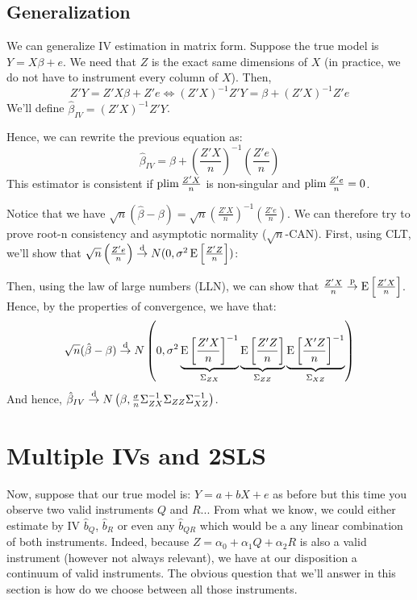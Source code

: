 \subsection{Generalization}

We can generalize IV estimation in matrix form. Suppose the true model is $Y = X\beta + e$. We need that $Z$ is the exact same dimensions of $X$ (in practice, we do not have to instrument every column of $X$). Then, $$Z'Y = Z'X\beta + Z'e \Leftrightarrow (Z'X)^{-1}Z'Y = \beta + (Z'X)^{-1}Z'e $$ We'll define $\hat\beta_{IV} = (Z'X)^{-1}Z'Y$.

Hence, we can rewrite the previous equation as: $$\hat\beta_{IV} = \beta + \left(\frac{Z'X}{n}\right)^{-1}\left(\frac{Z'e}{n}\right) $$
This estimator is consistent if $\operatorname{plim} \frac{Z'X}{n}$ is non-singular and $\operatorname{plim} \frac{Z'e}{n} = 0$.

Notice that we have $\sqrt{n}(\hat{\beta} - \beta) = \sqrt{n}\left(\frac{Z'X}{n}\right)^{-1}\left(\frac{Z'e}{n}\right)$. We can therefore try to prove root-n consistency and asymptotic normality ($\sqrt{n}$-CAN). First, using CLT, we'll show that $\sqrt{n}\left(\frac{Z'e}{n}\right)\overset{\text{d}}{\to} N(0,\sigma^2\operatorname{E}\left[\frac{Z'Z}{n}\right])$:

Then, using the law of large numbers (LLN), we can show that $\frac{Z'X}{n}\overset{\text{p}}{\to} \operatorname{E}\left[\frac{Z'X}{n}\right]$. Hence, by the properties of convergence, we have that: $$ \sqrt{n}(\hat{\beta} - \beta) \overset{\text{d}}{\to} N\left(0, \sigma^2 \underbrace{\operatorname{E}\left[\frac{Z'X}{n}\right]^{-1}}_{\Sigma_{ZX}}\underbrace{\operatorname{E}\left[\frac{Z'Z}{n}\right]}_{\Sigma_{ZZ}}\underbrace{\operatorname{E}\left[\frac{X'Z}{n}\right]^{-1}}_{\Sigma_{XZ}}\right)$$And hence, $\hat\beta_{IV}\overset{\text{d}}{\to} N\left(\beta, \frac{\sigma}{n}\Sigma_{ZX}^{-1}\Sigma_{ZZ}\Sigma_{XZ}^{-1}\right)$.

\section{Multiple IVs and 2SLS}

Now, suppose that our true model is: $Y = a + bX + e$ as before but this time you observe two valid instruments $Q$ and $R$... From what we know, we could either estimate by IV $\hat b_Q$, $\hat b_R$ or even any $\hat b_{QR}$ which would be a any linear combination of both instruments. Indeed, because $Z = \alpha_0 + \alpha_1 Q + \alpha_2 R$ is also a valid instrument (however not always relevant), we have at our disposition a continuum of valid instruments. The obvious question that we'll answer in this section is how do we choose between all those instruments.

